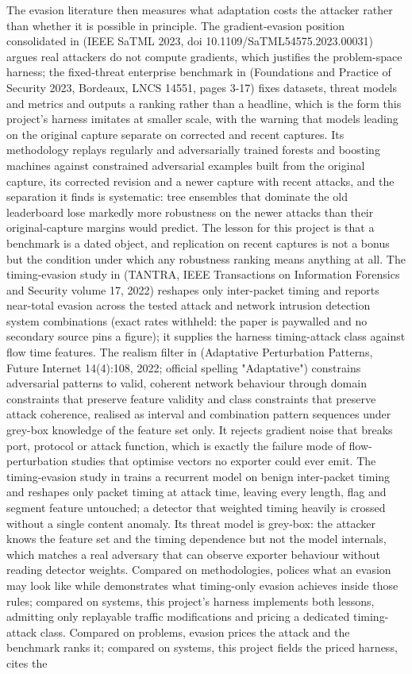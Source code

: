 The evasion literature then measures what adaptation costs the attacker rather than whether it is possible in principle. The gradient-evasion position consolidated in \cite{k30} (IEEE SaTML 2023, doi 10.1109/SaTML54575.2023.00031) argues real attackers do not compute gradients, which justifies the problem-space harness; the fixed-threat enterprise benchmark in \cite{k31} (Foundations and Practice of Security 2023, Bordeaux, LNCS 14551, pages 3-17) fixes datasets, threat models and metrics and outputs a ranking rather than a headline, which is the form this project's harness imitates at smaller scale, with the warning that models leading on the original capture separate on corrected and recent captures. Its methodology replays regularly and adversarially trained forests and boosting machines against constrained adversarial examples built from the original capture, its corrected revision and a newer capture with recent attacks, and the separation it finds is systematic: tree ensembles that dominate the old leaderboard lose markedly more robustness on the newer attacks than their original-capture margins would predict. The lesson for this project is that a benchmark is a dated object, and replication on recent captures is not a bonus but the condition under which any robustness ranking means anything at all. The timing-evasion study in \cite{k32} (TANTRA, IEEE Transactions on Information Forensics and Security volume 17, 2022) reshapes only inter-packet timing and reports near-total evasion across the tested attack and network intrusion detection system combinations (exact rates withheld: the paper is paywalled and no secondary source pins a figure); it supplies the harness timing-attack class against flow time features. The realism filter in \cite{k33} (Adaptative Perturbation Patterns, Future Internet 14(4):108, 2022; official spelling "Adaptative") constrains adversarial patterns to valid, coherent network behaviour through domain constraints that preserve feature validity and class constraints that preserve attack coherence, realised as interval and combination pattern sequences under grey-box knowledge of the feature set only. It rejects gradient noise that breaks port, protocol or attack function, which is exactly the failure mode of flow-perturbation studies that optimise vectors no exporter could ever emit. The timing-evasion study in \cite{k32} trains a recurrent model on benign inter-packet timing and reshapes only packet timing at attack time, leaving every length, flag and segment feature untouched; a detector that weighted timing heavily is crossed without a single content anomaly. Its threat model is grey-box: the attacker knows the feature set and the timing dependence but not the model internals, which matches a real adversary that can observe exporter behaviour without reading detector weights. Compared on methodologies, \cite{k33} polices what an evasion may look like while \cite{k32} demonstrates what timing-only evasion achieves inside those rules; compared on systems, this project's harness implements both lessons, admitting only replayable traffic modifications and pricing a dedicated timing-attack class. Compared on problems, evasion prices the attack and the benchmark ranks it; compared on systems, this project fields the priced harness, cites the 